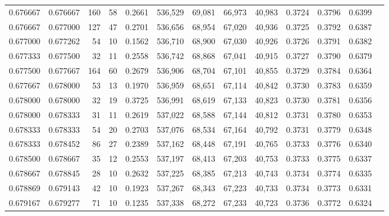 \begin{tabular}{rrrrrrrrrrrrr}
0.676667 & 0.676667 &   160 &  58 &                                     0.2661 & 536,529 &  69,081 &  66,973 &  40,983 & 0.3724 & 0.3796 & 0.6399 \\
0.676667 & 0.677000 &   127 &  47 &                                     0.2701 & 536,656 &  68,954 &  67,020 &  40,936 & 0.3725 & 0.3792 & 0.6387 \\
0.677000 & 0.677262 &    54 &  10 &                                     0.1562 & 536,710 &  68,900 &  67,030 &  40,926 & 0.3726 & 0.3791 & 0.6382 \\
0.677333 & 0.677500 &    32 &  11 &                                     0.2558 & 536,742 &  68,868 &  67,041 &  40,915 & 0.3727 & 0.3790 & 0.6379 \\
0.677500 & 0.677667 &   164 &  60 &                                     0.2679 & 536,906 &  68,704 &  67,101 &  40,855 & 0.3729 & 0.3784 & 0.6364 \\
0.677667 & 0.678000 &    53 &  13 &                                     0.1970 & 536,959 &  68,651 &  67,114 &  40,842 & 0.3730 & 0.3783 & 0.6359 \\
0.678000 & 0.678000 &    32 &  19 &                                     0.3725 & 536,991 &  68,619 &  67,133 &  40,823 & 0.3730 & 0.3781 & 0.6356 \\
0.678000 & 0.678333 &    31 &  11 &                                     0.2619 & 537,022 &  68,588 &  67,144 &  40,812 & 0.3731 & 0.3780 & 0.6353 \\
0.678333 & 0.678333 &    54 &  20 &                                     0.2703 & 537,076 &  68,534 &  67,164 &  40,792 & 0.3731 & 0.3779 & 0.6348 \\
0.678333 & 0.678452 &    86 &  27 &                                     0.2389 & 537,162 &  68,448 &  67,191 &  40,765 & 0.3733 & 0.3776 & 0.6340 \\
0.678500 & 0.678667 &    35 &  12 &                                     0.2553 & 537,197 &  68,413 &  67,203 &  40,753 & 0.3733 & 0.3775 & 0.6337 \\
0.678667 & 0.678845 &    28 &  10 &                                     0.2632 & 537,225 &  68,385 &  67,213 &  40,743 & 0.3734 & 0.3774 & 0.6335 \\
0.678869 & 0.679143 &    42 &  10 &                                     0.1923 & 537,267 &  68,343 &  67,223 &  40,733 & 0.3734 & 0.3773 & 0.6331 \\
0.679167 & 0.679277 &    71 &  10 &                                     0.1235 & 537,338 &  68,272 &  67,233 &  40,723 & 0.3736 & 0.3772 & 0.6324 \\

\end{tabular}
